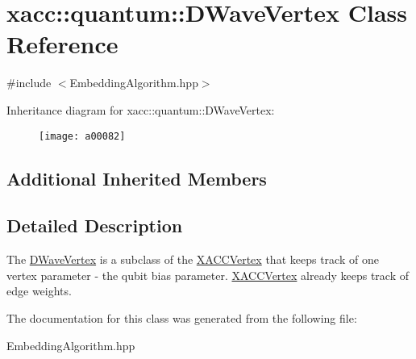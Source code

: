 \hypertarget{a00082}{}\section{xacc\+:\+:quantum\+:\+:D\+Wave\+Vertex Class Reference}
\label{a00082}


{\ttfamily \#include $<$Embedding\+Algorithm.\+hpp$>$}

Inheritance diagram for xacc\+:\+:quantum\+:\+:D\+Wave\+Vertex\+:\begin{figure}[H]
\begin{center}
\leavevmode
\texttt{[image: a00082]}
\end{center}
\end{figure}
\subsection*{Additional Inherited Members}


\subsection{Detailed Description}
The \hyperlink{a00082}{D\+Wave\+Vertex} is a subclass of the \hyperlink{a00340}{X\+A\+C\+C\+Vertex} that keeps track of one vertex parameter -\/ the qubit bias parameter. \hyperlink{a00340}{X\+A\+C\+C\+Vertex} already keeps track of edge weights. 

The documentation for this class was generated from the following file\+:\begin{DoxyCompactItemize}
\item 
Embedding\+Algorithm.\+hpp\end{DoxyCompactItemize}
